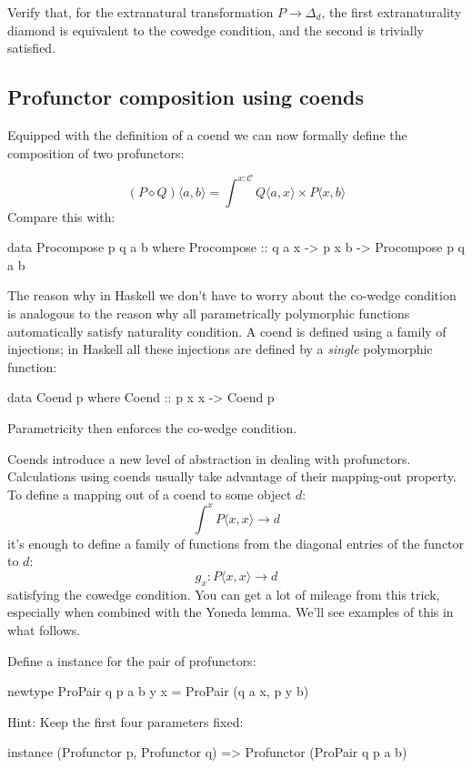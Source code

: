 \documentclass[DaoFP]{subfiles}
\begin{document}
\begin{exercise}
Verify that, for the extranatural transformation $P \to \Delta_d$, the first extranaturality diamond is equivalent to the cowedge condition, and the second is trivially satisfied.
\end{exercise}

\subsection{Profunctor composition using coends}

Equipped with the definition of a coend we can now formally define the composition of two profunctors:

\[ (P \diamond Q)\langle a, b \rangle = \int^{x\colon \mathcal{C}} Q \langle a, x \rangle \times P \langle x, b \rangle\]
Compare this with:
\begin{haskell}
data Procompose p q a b where
  Procompose ::  q a x -> p x b -> Procompose p q a b
\end{haskell}

The reason why in Haskell we don't have to worry about the co-wedge condition is analogous to the reason why all parametrically polymorphic functions automatically satisfy naturality condition. A coend is defined using a family of injections; in Haskell all these injections are defined by a \emph{single} polymorphic function:
\begin{haskell}
data Coend p where
  Coend ::  p x x -> Coend p
\end{haskell}
Parametricity then enforces the co-wedge condition.

Coends introduce a new level of abstraction in dealing with profunctors. Calculations using coends usually take advantage of their mapping-out property. To define a mapping out of a coend to some object $d$:
\[ \int^x P \langle x, x \rangle \to d \]
 it's enough to define a family of functions from the diagonal entries of the functor to $d$:
 \[ g_x \colon P \langle x, x \rangle \to d \]
 satisfying the cowedge condition. You can get a lot of mileage from this trick, especially when combined with the Yoneda lemma. We'll see examples of this in what follows.

\begin{exercise}
Define a  instance for the pair of profunctors:
\begin{haskell}
newtype ProPair q p a b y x = ProPair (q a x, p y b)
\end{haskell}
Hint: Keep the first four parameters fixed:
\begin{haskell}
instance (Profunctor p, Profunctor q) => Profunctor (ProPair q p a b)
\end{haskell}
\end{exercise}
\end{document}
